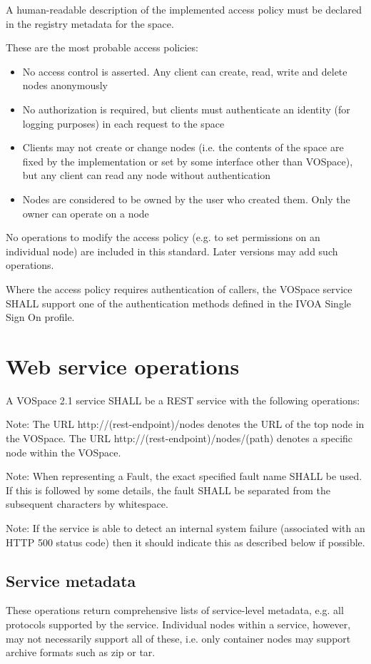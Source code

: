 \documentclass[11pt,a4paper]{ivoa}
\begin{document}
A human-readable description of the implemented access policy must be declared in the registry metadata for the space.

These are the most probable access policies:

\begin{itemize}
    \item No access control is asserted. Any client can create, read, write and delete nodes anonymously
    \item No authorization is required, but clients must authenticate an identity (for logging purposes) in each request to the space
    \item Clients may not create or change nodes (i.e. the contents of the space are fixed by the implementation or set by some interface other than VOSpace), but any client can read any node without authentication
    \item Nodes are considered to be owned by the user who created them. Only the owner can operate on a node
\end{itemize}

No operations to modify the access policy (e.g. to set permissions on an individual node) are included in this standard. Later versions may add such operations.

Where the access policy requires authentication of callers, the VOSpace service SHALL support one of the authentication methods defined in the IVOA Single Sign On profile.

\section{Web service operations}

A VOSpace 2.1 service SHALL be a REST service with the following operations:

Note: The URL http://(rest-endpoint)/nodes denotes the URL of the top node in the VOSpace. The URL http://(rest-endpoint)/nodes/(path) denotes a specific node within the VOSpace.

Note: When representing a Fault, the exact specified fault name SHALL be used. If this is followed by some details, the fault SHALL be separated from the subsequent characters by whitespace.

Note: If the service is able to detect an internal system failure (associated with an HTTP 500 status code) then it should indicate this as described below if possible.

\subsection{Service metadata}
These operations return comprehensive lists of service-level metadata, e.g. all protocols supported by the service. Individual nodes within a service, however, may not necessarily support all of these, i.e. only container nodes may support archive formats such as zip or tar.
\end{document}
